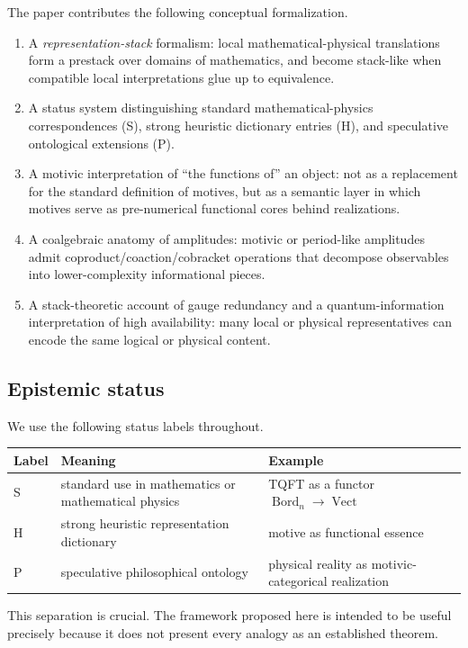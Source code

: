 \documentclass[11pt]{article}
\newcommand{\Bord}{\operatorname{Bord}}
\newcommand{\Vect}{\operatorname{Vect}}
\newcommand{\Sstd}{\textsf{S}}
\newcommand{\Sheur}{\textsf{H}}
\newcommand{\Pspec}{\textsf{P}}
\begin{document}
The paper contributes the following conceptual formalization.
\begin{enumerate}
    \item A \emph{representation-stack} formalism: local mathematical-physical translations form a prestack over domains of mathematics, and become stack-like when compatible local interpretations glue up to equivalence.
    \item A status system distinguishing standard mathematical-physics correspondences (\Sstd), strong heuristic dictionary entries (\Sheur), and speculative ontological extensions (\Pspec).
    \item A motivic interpretation of ``the functions of'' an object: not as a replacement for the standard definition of motives, but as a semantic layer in which motives serve as pre-numerical functional cores behind realizations.
    \item A coalgebraic anatomy of amplitudes: motivic or period-like amplitudes admit coproduct/coaction/cobracket operations that decompose observables into lower-complexity informational pieces.
    \item A stack-theoretic account of gauge redundancy and a quantum-information interpretation of high availability: many local or physical representatives can encode the same logical or physical content.
\end{enumerate}

\subsection{Epistemic status}

We use the following status labels throughout.
\begin{center}
\begin{tabular}{@{}lll@{}}
\toprule
Label & Meaning & Example \\
\midrule
\Sstd & standard use in mathematics or mathematical physics & TQFT as a functor $\Bord_n\to\Vect$ \\
\Sheur & strong heuristic representation dictionary & motive as functional essence \\
\Pspec & speculative philosophical ontology & physical reality as motivic-categorical realization \\
\bottomrule
\end{tabular}
\end{center}
This separation is crucial. The framework proposed here is intended to be useful precisely because it does not present every analogy as an established theorem.
\end{document}
